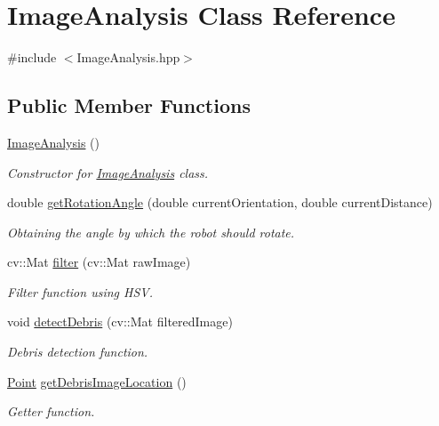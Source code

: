\hypertarget{classImageAnalysis}{}\section{Image\+Analysis Class Reference}
\label{classImageAnalysis}


{\ttfamily \#include $<$Image\+Analysis.\+hpp$>$}

\subsection*{Public Member Functions}
\begin{DoxyCompactItemize}
\item 
\hyperlink{classImageAnalysis_a9a05460445d26581927b73f26b454db1}{Image\+Analysis} ()
\begin{DoxyCompactList}\small\item\em Constructor for \hyperlink{classImageAnalysis}{Image\+Analysis} class. \end{DoxyCompactList}\item 
double \hyperlink{classImageAnalysis_a71f0d5076443121ea81c7142e854cb32}{get\+Rotation\+Angle} (double current\+Orientation, double current\+Distance)
\begin{DoxyCompactList}\small\item\em Obtaining the angle by which the robot should rotate. \end{DoxyCompactList}\item 
cv\+::\+Mat \hyperlink{classImageAnalysis_ad138d68fd0f31fa0e896321d56a4d7e0}{filter} (cv\+::\+Mat raw\+Image)
\begin{DoxyCompactList}\small\item\em Filter function using H\+SV. \end{DoxyCompactList}\item 
void \hyperlink{classImageAnalysis_a8bab2847e38371a8a0bbeb7a4ae46dd8}{detect\+Debris} (cv\+::\+Mat filtered\+Image)
\begin{DoxyCompactList}\small\item\em Debris detection function. \end{DoxyCompactList}\item 
\hyperlink{classPoint}{Point} \hyperlink{classImageAnalysis_aedf9a6a46c20c2dc01579d80df30ee7e}{get\+Debris\+Image\+Location} ()
\begin{DoxyCompactList}\small\item\em Getter function. \end{DoxyCompactList}\end{DoxyCompactItemize}


